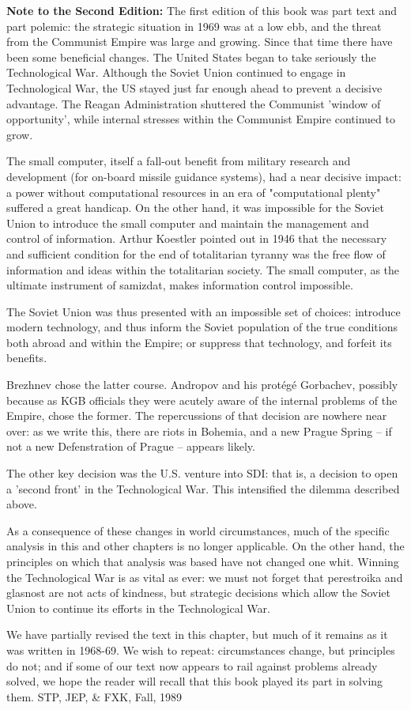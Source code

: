 \begin{mdframed}[backgroundcolor=black!10]
\textbf{Note to the Second Edition:}
The first edition of this book was part text and part polemic: the strategic situation in 1969 was at a low ebb, and the threat from the Communist Empire was large and growing. Since that time there have been some beneficial changes. The United States began to take seriously the Technological War. Although the Soviet Union continued to engage in Technological War, the US stayed just far enough ahead to prevent a decisive advantage. The Reagan Administration shuttered the Communist 'window of opportunity', while internal stresses within the Communist Empire continued to grow.

The small computer, itself a fall-out benefit from military research and development (for on-board missile guidance systems), had a near decisive impact: a power without computational resources in an era of "computational plenty" suffered a great handicap. On the other hand, it was impossible for the Soviet Union to introduce the small computer and maintain the management and control of information. Arthur Koestler pointed out in 1946 that the necessary and sufficient condition for the end of totalitarian tyranny was the free flow of information and ideas within the totalitarian society. The small computer, as the ultimate instrument of samizdat, makes information control impossible.

The Soviet Union was thus presented with an impossible set of choices: introduce modern technology, and thus inform the Soviet population of the true conditions both abroad and within the Empire; or suppress that technology, and forfeit its benefits.

Brezhnev chose the latter course. Andropov and his protégé Gorbachev, possibly because as KGB officials they were acutely aware of the internal problems of the Empire, chose the former. The repercussions of that decision are nowhere near over: as we write this, there are riots in Bohemia, and a new Prague Spring -- if not a new Defenstration of Prague -- appears likely.

The other key decision was the U.S. venture into SDI: that is, a decision to open a 'second front' in the Technological War. This intensified the dilemma described above.

As a consequence of these changes in world circumstances, much of the specific analysis in this and other chapters is no longer applicable. On the other hand, the principles on which that analysis was based have not changed one whit. Winning the Technological War is as vital as ever: we must not forget that perestroika and glasnost are not acts of kindness, but strategic decisions which allow the Soviet Union to continue its efforts in the Technological War.

We have partially revised the text in this chapter, but much of it remains as it was written in 1968-69. We wish to repeat: circumstances change, but principles do not; and if some of our text now appears to rail against problems already solved, we hope the reader will recall that this book played its part in solving them. STP, JEP, \& FXK, Fall, 1989
\end{mdframed}

